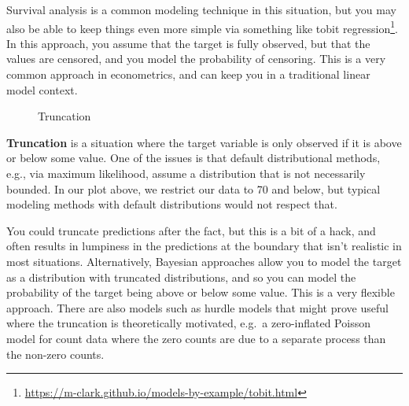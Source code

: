 \documentclass[
  letterpaper,
]{krantz}
\DeclareRobustCommand{\href}[2]{#2\footnote{\url{#1}}}
\begin{document}
Survival analysis is a common modeling technique in this situation, but
you may also be able to keep things even more simple via something like
\href{https://m-clark.github.io/models-by-example/tobit.html}{tobit
regression}. In this approach, you assume that the target is fully
observed, but that the values are censored, and you model the
probability of censoring. This is a very common approach in
econometrics, and can keep you in a traditional linear model context.

\begin{figure}[H]


\caption{\label{fig-truncation}Truncation}

\end{figure}%

\textbf{Truncation} is a situation where the target variable is only
observed if it is above or below some value. One of the issues is that
default distributional methods, e.g., via maximum likelihood, assume a
distribution that is not necessarily bounded. In our plot above, we
restrict our data to 70 and below, but typical modeling methods with
default distributions would not respect that.

You could truncate predictions after the fact, but this is a bit of a
hack, and often results in lumpiness in the predictions at the boundary
that isn't realistic in most situations. Alternatively, Bayesian
approaches allow you to model the target as a distribution with
truncated distributions, and so you can model the probability of the
target being above or below some value. This is a very flexible
approach. There are also models such as hurdle models that might prove
useful where the truncation is theoretically motivated, e.g.~a
zero-inflated Poisson model for count data where the zero counts are due
to a separate process than the non-zero counts.
\end{document}
